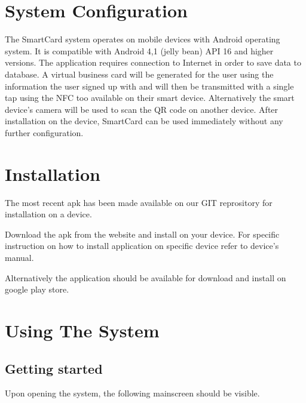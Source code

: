\documentclass[english]{article}
\begin{document}
	\section{System Configuration}
	The SmartCard system operates on mobile devices with Android operating system. It is compatible with
	Android 4,1 (jelly bean) API 16 and higher versions. The application requires connection to Internet in order to
	save data to database. A virtual business card will be generated for the user using the information the user signed up with and will then be transmitted with a single tap using the NFC too available on their smart device. Alternatively the smart device’s camera will be used to scan the QR code on another device. After
	installation on the device, SmartCard can be used immediately without any further configuration.
	\section{Installation}
	The most recent apk has been made available on our GIT reprository for installation on a device. 
	
	Download the apk from the website and install on your device. For specific instruction on how to install application on specific device refer to
	device’s manual.
	
	Alternatively the application should be available for download and install on google play store.
	

	\section {Using The System}
	\subsection{Getting started}
	Upon opening the system, the following mainscreen should be visible.
		
\end{document}
